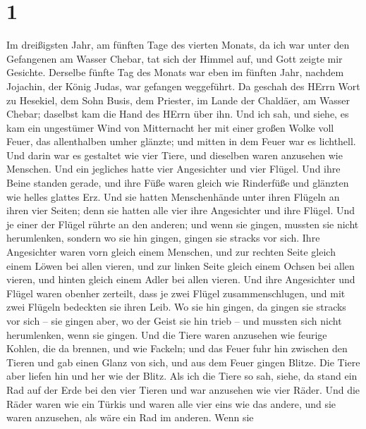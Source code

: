 \hypertarget{section}{%
\section{1}\label{section}}

 Im dreißigsten Jahr, am fünften Tage des vierten Monats, da
ich war unter den Gefangenen am Wasser Chebar, tat sich der Himmel auf,
und Gott zeigte mir Gesichte.  Derselbe fünfte Tag des
Monats war eben im fünften Jahr, nachdem Jojachin, der König Judas, war
gefangen weggeführt.  Da geschah des HErrn Wort zu Hesekiel,
dem Sohn Busis, dem Priester, im Lande der Chaldäer, am Wasser Chebar;
daselbst kam die Hand des HErrn über ihn.  Und ich sah, und
siehe, es kam ein ungestümer Wind von Mitternacht her mit einer großen
Wolke voll Feuer, das allenthalben umher glänzte; und mitten in dem
Feuer war es lichthell.  Und darin war es gestaltet wie vier
Tiere, und dieselben waren anzusehen wie Menschen.  Und ein
jegliches hatte vier Angesichter und vier Flügel.  Und ihre
Beine standen gerade, und ihre Füße waren gleich wie Rinderfüße und
glänzten wie helles glattes Erz.  Und sie hatten
Menschenhände unter ihren Flügeln an ihren vier Seiten; denn sie hatten
alle vier ihre Angesichter und ihre Flügel.  Und je einer
der Flügel rührte an den anderen; und wenn sie gingen, mussten sie nicht
herumlenken, sondern wo sie hin gingen, gingen sie stracks vor sich.
 Ihre Angesichter waren vorn gleich einem Menschen, und zur
rechten Seite gleich einem Löwen bei allen vieren, und zur linken Seite
gleich einem Ochsen bei allen vieren, und hinten gleich einem Adler bei
allen vieren.  Und ihre Angesichter und Flügel waren
obenher zerteilt, dass je zwei Flügel zusammenschlugen, und mit zwei
Flügeln bedeckten sie ihren Leib.  Wo sie hin gingen, da
gingen sie stracks vor sich -- sie gingen aber, wo der Geist sie hin
trieb -- und mussten sich nicht herumlenken, wenn sie gingen.
 Und die Tiere waren anzusehen wie feurige Kohlen, die da
brennen, und wie Fackeln; und das Feuer fuhr hin zwischen den Tieren und
gab einen Glanz von sich, und aus dem Feuer gingen Blitze. 
Die Tiere aber liefen hin und her wie der Blitz.  Als ich
die Tiere so sah, siehe, da stand ein Rad auf der Erde bei den vier
Tieren und war anzusehen wie vier Räder.  Und die Räder
waren wie ein Türkis und waren alle vier eins wie das andere, und sie
waren anzusehen, als wäre ein Rad im anderen.  Wenn sie
